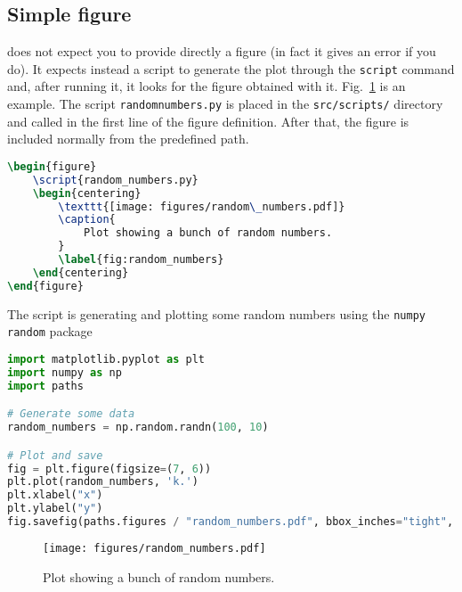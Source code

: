 \documentclass{aa}
\begin{document}
\subsection{Simple figure}
\showyourwork does not expect you to provide directly a figure (in fact it gives an error if you do).
It expects instead a script to generate the plot through the \texttt{script} command and, after running it, it looks for the figure obtained with it.
Fig.~\ref{fig:random_numbers} is an example. The script \texttt{randomnumbers.py} is placed in the \texttt{src/scripts/} directory and called in the first line of the figure definition. After that, the figure is included normally from the predefined path.
\begin{lstlisting}[language=TeX]
\begin{figure}
    \script{random_numbers.py}
    \begin{centering}
        \texttt{[image: figures/random\_numbers.pdf]}
        \caption{
            Plot showing a bunch of random numbers.
        }
        \label{fig:random_numbers}
    \end{centering}
\end{figure}
\end{lstlisting}
The script is generating and plotting some random numbers using the \texttt{numpy random} package 
\begin{lstlisting}[language=python]
import matplotlib.pyplot as plt
import numpy as np
import paths

# Generate some data
random_numbers = np.random.randn(100, 10)

# Plot and save
fig = plt.figure(figsize=(7, 6))
plt.plot(random_numbers, 'k.')
plt.xlabel("x")
plt.ylabel("y")
fig.savefig(paths.figures / "random_numbers.pdf", bbox_inches="tight", dpi=300)
\end{lstlisting}

\begin{figure}
    \begin{centering}
        \texttt{[image: figures/random\_numbers.pdf]}
        \caption{
            Plot showing a bunch of random numbers.
        }
        \label{fig:random_numbers}
    \end{centering}
\end{figure}
\end{document}
